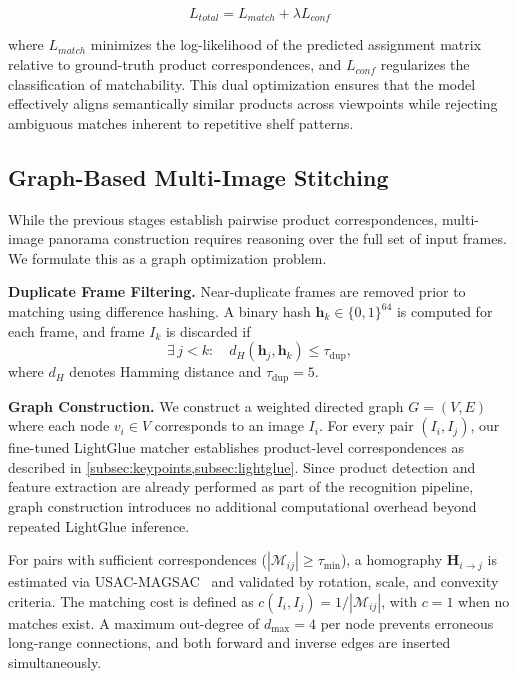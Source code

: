 \documentclass[10pt,twocolumn,letterpaper]{article}
\begin{document}
\begin{equation}
    L_{total} = L_{match} + \lambda L_{conf}
\end{equation}

where $L_{match}$ minimizes the log-likelihood of the predicted assignment matrix relative to ground-truth product correspondences, and $L_{conf}$ regularizes the classification of matchability. This dual optimization ensures that the model effectively aligns semantically similar products across viewpoints while rejecting ambiguous matches inherent to repetitive shelf patterns.

\subsection{Graph-Based Multi-Image Stitching}
\label{subsec:stitching}

While the previous stages establish pairwise product correspondences,
multi-image panorama construction requires reasoning over the full set of
input frames. We formulate this as a graph optimization problem.

\noindent\textbf{Duplicate Frame Filtering.}
Near-duplicate frames are removed prior to matching using difference hashing. A binary hash $\mathbf{h}_k \in \{0,1\}^{64}$
is computed for each frame, and frame $I_k$ is discarded if
\begin{equation}
    \exists\, j < k : \quad d_H(\mathbf{h}_j, \mathbf{h}_k) \leq \tau_{\mathrm{dup}},
\end{equation}
where $d_H$ denotes Hamming distance and $\tau_{\mathrm{dup}} = 5$.

\noindent\textbf{Graph Construction.}
We construct a weighted directed graph $G = (V, E)$ where each node
$v_i \in V$ corresponds to an image $I_i$. For every pair $(I_i, I_j)$,
our fine-tuned LightGlue matcher establishes product-level correspondences
as described in \cref{subsec:keypoints,subsec:lightglue}. Since product
detection and feature extraction are already performed as part of the
recognition pipeline, graph construction introduces no additional
computational overhead beyond repeated LightGlue inference.

For pairs with sufficient correspondences ($|\mathcal{M}_{ij}| \geq \tau_{\min}$),
a homography $\mathbf{H}_{i \to j}$ is estimated via USAC-MAGSAC~\cite{Barath_2020_CVPR}
and validated by rotation, scale, and convexity criteria.
The matching cost is defined as $c(I_i, I_j) = 1 / |\mathcal{M}_{ij}|$,
with $c = 1$ when no matches exist.
A maximum out-degree of $d_{\max} = 4$ per node prevents erroneous
long-range connections, and both forward and inverse edges are inserted simultaneously.
\end{document}
